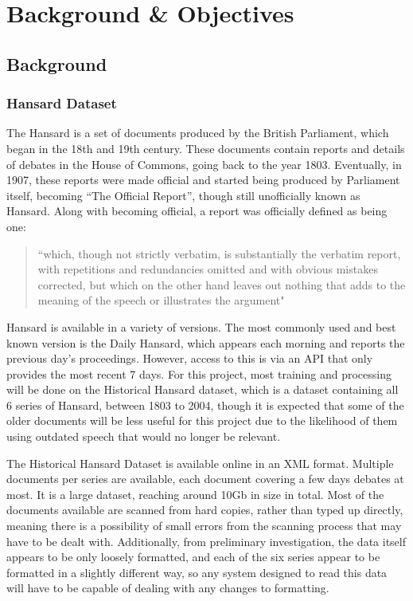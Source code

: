 \chapter{Background \& Objectives}

\section{Background}
\label{sec:bck_background}
\subsection{Hansard Dataset}
\label{sec:bck_hansard}
The Hansard is a set of documents produced by the British Parliament, which began in the 18th and 19th century. These documents contain reports and details of debates in the House of Commons, going back to the year 1803. Eventually, in 1907, these reports were made official and started being produced by Parliament itself, becoming “The Official Report”, though still unofficially known as Hansard. Along with becoming official, a report was officially defined as being one:
\begin{quote} “which, though not strictly verbatim, is substantially the verbatim report, with repetitions and redundancies omitted and with obvious mistakes corrected, but which on the other hand leaves out nothing that adds to the meaning of the speech or illustrates the argument"\cite{HouseofCommonsInformationOffice2010}
\end{quote}
Hansard is available in a variety of versions. The most commonly used and best known version is the Daily Hansard, which appears each morning and reports the previous day’s proceedings. However, access to this is via an API that only provides the most recent 7 days. For this project, most training and processing will be done on the Historical Hansard dataset, which is a dataset containing all 6 series of Hansard, between 1803 to 2004, though it is expected that some of the older documents will be less useful for this project due to the likelihood of them using outdated speech that would no longer be relevant.

The Historical Hansard Dataset is available online in an XML format. Multiple documents per series are available, each document covering a few days debates at most. It is a large dataset, reaching around 10Gb in size in total. Most of the documents available are scanned from hard copies, rather than typed up directly, meaning there is a possibility of small errors from the scanning process that may have to be dealt with. Additionally, from preliminary investigation, the data itself appears to be only loosely formatted, and each of the six series appear to be formatted in a slightly different way, so any system designed to read this data will have to be capable of dealing with any changes to formatting.

